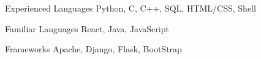 

\begin{cvskills}

  \cvskill
  {Experienced Languages} %
  {Python, C, C++, SQL, HTML/CSS, Shell} %

  \cvskill
  {Familiar Languages} %
  {React, Java, JavaScript} %

  \cvskill
  {Frameworks} %
  {Apache, Django, Flask, BootStrap} %


\end{cvskills}

